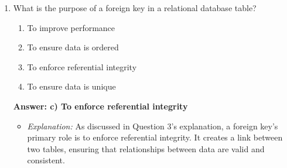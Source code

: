 \documentclass{article}
\begin{document}
\begin{enumerate}[label=\textbf{Question \arabic*.}]
\item What is the purpose of a foreign key in a relational database table?
    \begin{enumerate}[label=\alph*)]
        \item To improve performance
        \item To ensure data is ordered
        \item To enforce referential integrity
        \item To ensure data is unique
    \end{enumerate}
    \textbf{Answer: c) To enforce referential integrity}
    \begin{itemize}
        \item \textit{Explanation:} As discussed in Question 3's explanation, a foreign key's primary role is to enforce referential integrity. It creates a link between two tables, ensuring that relationships between data are valid and consistent.
    \end{itemize}

\end{enumerate}
\end{document}
